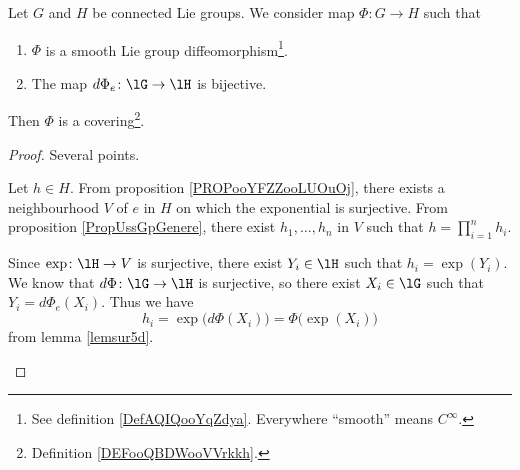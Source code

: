 \begin{lemma}     \label{LEMooSYVQooTjkgBL}
    Let \( G\) and \( H\) be connected Lie groups. We consider map \( \Phi\colon G\to H\) such that
    \begin{enumerate}
        \item
            \( \Phi\) is a smooth Lie group diffeomorphism\footnote{See definition \ref{DefAQIQooYqZdya}. Everywhere ``smooth'' means \(  C^{\infty}\).}.
             \item
                 The map \( d\Phi_e\colon \lG\to \lH\) is bijective.
    \end{enumerate}
    Then \( \Phi\) is a covering\footnote{Definition \ref{DEFooQBDWooVVrkkh}.}.
\end{lemma}

\begin{proof}
    Several points.
    \begin{subproof}
        Let \( h\in H\). From proposition \ref{PROPooYFZZooLUOuOj}, there exists a neighbourhood \( V\) of \( e\) in \( H\) on which the exponential is surjective. From proposition \ref{PropUssGpGenere}, there exist \( h_1,\ldots, h_n\) in \( V\) such that \( h=\prod_{i=1}^nh_i\).

        Since \( \exp\colon \lH\to V\) is surjective, there exist \( Y_i\in \lH\) such that \( h_i=\exp(Y_i)\). We know that \( d\Phi\colon \lG\to \lH\) is surjective, so there exist \( X_i\in\lG\) such that \( Y_i=d\Phi_e(X_i)\). Thus we have 
        \begin{equation}
            h_i=\exp\big( d\Phi(X_i) \big)=\Phi\big( \exp(X_i) \big)
        \end{equation}
        from lemma \ref{lemsur5d}.


\end{subproof}
\end{proof}
